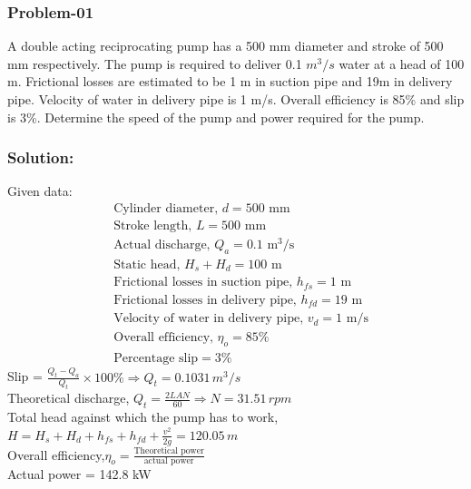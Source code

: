 \documentclass{article}
\begin{document}
    \begin{multicols*}{2}
      \subsubsection*{Problem-01}
      A double acting reciprocating pump has a 500 mm diameter and stroke of 500 mm respectively. The pump is required to deliver 0.1 $m^3/s$ water at a head of 100 m. Frictional losses are estimated to be 1 m in suction pipe and 19m in delivery pipe. Velocity of water in delivery pipe is 1 m/s. Overall efficiency is 85\% and slip is 3\%. Determine the speed of the pump and power required for the pump. 

      \subsubsection*{Solution:} 
      Given data:\\
      \begin{align*}
        &\text{Cylinder diameter, } d = 500 \text{ mm} \\
        &\text{Stroke length, } L = 500 \text{ mm} \\
        &\text{Actual discharge, } Q_a = 0.1 \text{ m}^3/\text{s} \\
        &\text{Static head, } H_s + H_d = 100 \text{ m} \\
        &\text{Frictional losses in suction pipe, } h_{fs} = 1 \text{ m} \\
        &\text{Frictional losses in delivery pipe, } h_{fd} = 19 \text{ m} \\
        &\text{Velocity of water in delivery pipe, } v_d = 1 \text{ m/s} \\ 
        &\text{Overall efficiency, } \eta_o = 85\% \\
        &\text{Percentage slip} = 3\%  
      \end{align*}
      Slip = $\frac{Q_t - Q_a}{Q_t} \times 100\% \Rightarrow Q_t = 0.1031 \, m^3/s $   \\
      Theoretical discharge, $Q_t = \frac{2LAN}{60} \Rightarrow  N = 31.51 \, rpm $  \\
      Total head against which the pump has to work, \\
      $H = H_s + H_d + h_{fs} + h_{fd} + \frac{v^2}{2g} = 120.05 \,m$ \\
      Overall efficiency,$\eta_o = \frac{\text{Theoretical power}}{\text{actual power}}$ \\
      Actual power = 142.8 kW  


\end{multicols*}
\end{document}
